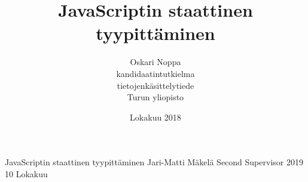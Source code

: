 \documentclass[a4paper, 12pt]{report}
\title{JavaScriptin staattinen tyypittäminen}
\author{Oskari Noppa \\kandidaatintutkielma \\ tietojenkäsittelytiede \\ Turun yliopisto}
\date{Lokakuu 2018}
\begin{document}
  \fintrue

  \iffin
  \renewcommand{\appname}{Liitteet}
  \else
  \renewcommand{\appname}{Appendices}
  \fi
  
  {JavaScriptin staattinen tyypittäminen}
  {Jari-Matti Mäkelä}
  {Second Supervisor}
  {2019}
  {10}
  {Lokakuu}
  
  
  \gentitle
  
  \pagestyle{empty}
  
  
  \tableofcontents
  \clearpage
  
  
\end{document}
